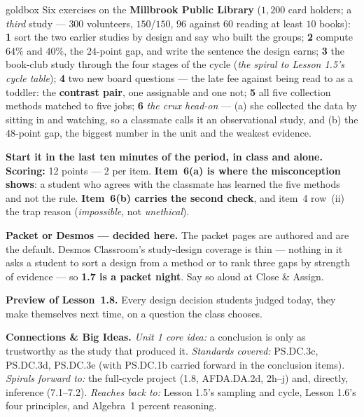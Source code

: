 \documentclass[10pt]{article}
\begin{document}
\boxguard
\begin{skillbox}{goldbox}
Six exercises on the \textbf{Millbrook Public Library} ($1{,}200$ card holders; a \emph{third}
study --- $300$ volunteers, $150$/$150$, $96$ against $60$ reading at least $10$ books):
\textbf{1} sort the two earlier studies by design and say who built the groups; \textbf{2}
compute $64\%$ and $40\%$, the $24$-point gap, and write the sentence the design earns;
\textbf{3} the book-club study through the four stages of the cycle (\emph{the spiral to Lesson
1.5's cycle table}); \textbf{4} two new board questions --- the late fee against being read to
as a toddler: the \textbf{contrast pair}, one assignable and one not; \textbf{5} all five
collection methods matched to five jobs; \textbf{6} \emph{the crux head-on} --- (a) she
collected the data by sitting in and watching, so a classmate calls it an observational study,
and (b) the $48$-point gap, the biggest number in the unit and the weakest evidence.

\textbf{Start it in the last ten minutes of the period, in class and alone.} \textbf{Scoring:}
12 points --- 2 per item. \textbf{Item~6(a) is where the misconception shows}: a student who
agrees with the classmate has learned the five methods and not the rule. \textbf{Item~6(b)
carries the second check}, and item~4 row~(ii) the trap reason (\emph{impossible}, not
\emph{unethical}).

\textbf{Packet or Desmos --- decided here.} The packet pages are authored and are the default.
Desmos Classroom's study-design coverage is thin --- nothing in it asks a student to sort a
design from a method or to rank three gaps by strength of evidence --- so \textbf{1.7 is a
packet night}. Say so aloud at Close \& Assign.

\textbf{Preview of Lesson~1.8.} Every design decision students judged today, they make
themselves next time, on a question the class chooses.

\textbf{Connections \& Big Ideas.} \textit{Unit 1 core idea:} a conclusion is only as
trustworthy as the study that produced it. \textit{Standards covered:} PS.DC.3c, PS.DC.3d,
PS.DC.3e (with PS.DC.1b carried forward in the conclusion items). \textit{Spirals forward to:}
the full-cycle project (1.8, AFDA.DA.2d, 2h--j) and, directly, inference (7.1--7.2).
\textit{Reaches back to:} Lesson 1.5's sampling and cycle, Lesson 1.6's four principles, and
Algebra~1 percent reasoning.
\end{skillbox}
\end{document}
